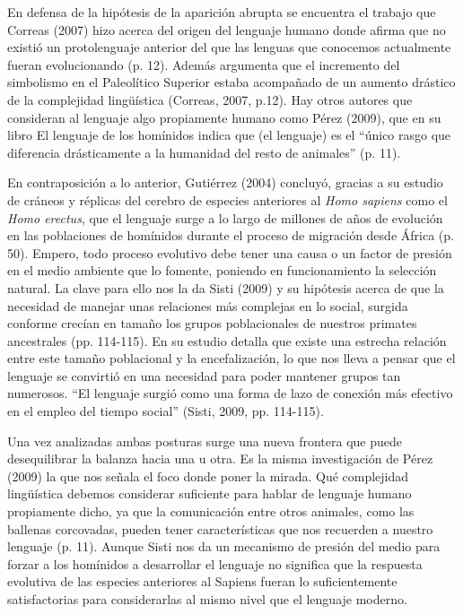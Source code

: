 \documentclass[12pt, a4paper, oneside]{report}
\begin{document}
            En defensa de la hipótesis de la aparición abrupta se encuentra el trabajo que Correas (2007) hizo
            acerca del origen del lenguaje humano donde afirma que no existió un protolenguaje anterior del
            que las lenguas que conocemos actualmente fueran evolucionando (p. 12). Además argumenta que
            el incremento del simbolismo en el Paleolítico Superior estaba acompañado de un aumento drástico
            de la complejidad lingüística (Correas, 2007, p.12). Hay otros autores que consideran al lenguaje
            algo propiamente humano como Pérez (2009), que en su libro El lenguaje de los homínidos indica que
            (el lenguaje) es el ``único rasgo que diferencia drásticamente a la humanidad del resto de
            animales'' (p. 11).

            En contraposición a lo anterior, Gutiérrez (2004) concluyó, gracias a su estudio de cráneos y
            réplicas del cerebro de especies anteriores al \emph{Homo sapiens} como el \emph{Homo erectus},
            que el lenguaje surge a lo largo de millones de años de evolución en las poblaciones de homínidos
            durante el proceso de migración desde África (p. 50). Empero, todo proceso evolutivo debe tener
            una causa o un factor de presión en el medio ambiente que lo fomente, poniendo en funcionamiento
            la selección natural. La clave para ello nos la da Sisti (2009) y su hipótesis acerca de que la
            necesidad de manejar unas relaciones más complejas en lo social, surgida conforme crecían en
            tamaño los grupos poblacionales de nuestros primates ancestrales (pp. 114-115). En su estudio
            detalla que existe una estrecha relación entre este tamaño poblacional y la encefalización,
            lo que nos lleva a pensar que el lenguaje se convirtió en una necesidad para poder mantener grupos
            tan numerosos. ``El lenguaje surgió como una forma de lazo de conexión más efectivo en el empleo
            del tiempo social'' (Sisti, 2009, pp. 114-115).

            Una vez analizadas ambas posturas surge una nueva frontera que puede desequilibrar la balanza
            hacia una u otra. Es la misma investigación de Pérez (2009) la que nos señala el foco donde poner
            la mirada. Qué complejidad lingüística debemos considerar suficiente para hablar de lenguaje
            humano propiamente dicho, ya que la comunicación entre otros animales, como las ballenas
            corcovadas, pueden tener características que nos recuerden a nuestro lenguaje (p. 11). Aunque
            Sisti nos da un mecanismo de presión del medio para forzar a los homínidos a desarrollar el
            lenguaje no significa que la respuesta evolutiva de las especies anteriores al Sapiens fueran lo
            suficientemente satisfactorias para considerarlas al mismo nivel que el lenguaje moderno.
        \clearpage
\end{document}
